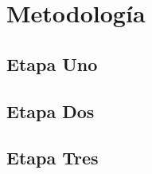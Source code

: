 \chapter{Metodología}

\section{Etapa Uno}
    \lipsum[2]

\section{Etapa Dos}
    \lipsum[7] 
    
    \cite{martinez2023future} \lipsum[8]
    
\section{Etapa Tres}
    \lipsum[1]